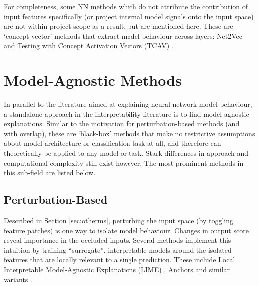 \documentclass[main]{subfiles}
\begin{document}





For completeness, some NN methods which do not attribute the contribution of input features specifically (or project internal model signals onto the input space) are not within project scope as a result, but are mentioned here. These are `concept vector' methods that extract model behaviour across layers: Net2Vec \cite{net2vec} and Testing with Concept Activation Vectors (TCAV) \cite{tcav}.





\section{Model-Agnostic Methods} \label{sec:modelag}

In parallel to the literature aimed at explaining neural network model behaviour, a standalone approach in the interpretability literature is to find model-agnostic explanations. Similar to the motivation for perturbation-based methods (and with overlap), these are `black-box' methods that make no restrictive assumptions about model architecture or classification task at all, and therefore can theoretically be applied to any model or task. Stark differences in approach and computational complexity still exist however. The most prominent methods in this sub-field are listed below.


\subsection{Perturbation-Based} \label{sec:perturbag}
Described in Section \ref{sec:otherms}, perturbing the input space (by toggling feature patches) is one way to isolate model behaviour. Changes in output score reveal importance in the occluded inputs. Several methods implement this intuition by training ``surrogate'', interpretable models around the isolated features that are locally relevant to a single prediction. These include Local Interpretable Model-Agnostic Explanations (LIME) \cite{lime}, Anchors \cite{anchors} and similar variants \cite{local}.
\end{document}
